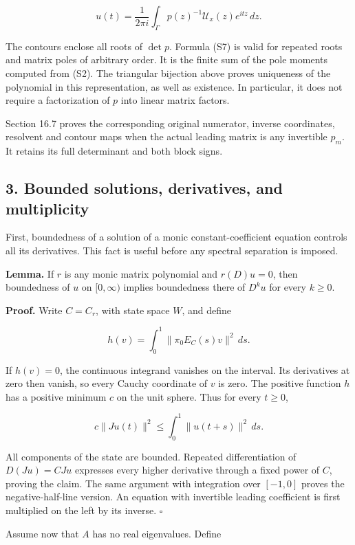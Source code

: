 \documentclass[
  11pt,
]{article}
\begin{document}
\[
u(t)=\frac{1}{2\pi i}\int_\Gamma
p(z)^{-1}\mathcal U_x(z)e^{itz}\,dz.                       \tag{S7}
\]

The contours enclose all roots of \(\det p\). Formula (S7) is valid for
repeated roots and matrix poles of arbitrary order. It is the finite sum
of the pole moments computed from (S2). The triangular bijection above
proves uniqueness of the polynomial in this representation, as well as
existence. In particular, it does not require a factorization of \(p\)
into linear matrix factors.

Section 16.7 proves the corresponding original numerator, inverse
coordinates, resolvent and contour maps when the actual leading matrix
is any invertible \(p_m\). It retains its full determinant and both
block signs.

\subsection{3. Bounded solutions, derivatives, and
multiplicity}\label{bounded-solutions-derivatives-and-multiplicity}

First, boundedness of a solution of a monic constant-coefficient
equation controls all its derivatives. This fact is useful before any
spectral separation is imposed.

\textbf{Lemma.} If \(r\) is any monic matrix polynomial and \(r(D)u=0\),
then boundedness of \(u\) on \([0,\infty)\) implies boundedness there of
\(D^ku\) for every \(k\geq0\).

\textbf{Proof.} Write \(C=C_r\), with state space \(W\), and define

\[
h(v)=\int_0^1\|\pi_0E_C(s)v\|^2\,ds.
\]

If \(h(v)=0\), the continuous integrand vanishes on the interval. Its
derivatives at zero then vanish, so every Cauchy coordinate of \(v\) is
zero. The positive function \(h\) has a positive minimum \(c\) on the
unit sphere. Thus for every \(t\geq0\),

\[
c\|Ju(t)\|^2\leq
\int_0^1\|u(t+s)\|^2\,ds.
\]

All components of the state are bounded. Repeated differentiation of
\(D(Ju)=CJu\) expresses every higher derivative through a fixed power of
\(C\), proving the claim. The same argument with integration over
\([-1,0]\) proves the negative-half-line version. An equation with
invertible leading coefficient is first multiplied on the left by its
inverse. \(\square\)

Assume now that \(A\) has no real eigenvalues. Define
\end{document}
